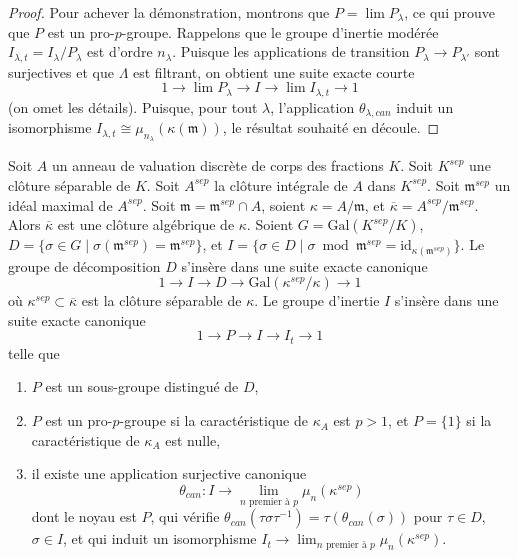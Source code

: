 \begin{proof}
\medskip\noindent
Pour achever la démonstration, montrons que $P = \lim P_\lambda$, ce qui prouve
que $P$ est un pro-$p$-groupe. Rappelons que le groupe d'inertie modérée
$I_{\lambda, t} = I_\lambda/P_\lambda$ est d'ordre $n_\lambda$.
Puisque les applications de transition $P_\lambda \to P_{\lambda'}$ sont surjectives
et que $\Lambda$ est filtrant, on obtient une suite exacte courte
$$
1 \to \lim P_\lambda \to I \to \lim I_{\lambda, t} \to 1
$$
(on omet les détails). Puisque, pour tout $\lambda$, l'application $\theta_{\lambda, can}$
induit un isomorphisme
$I_{\lambda, t} \cong \mu_{n_\lambda}(\kappa(\mathfrak m))$,
le résultat souhaité en découle.
\end{proof}

\begin{lemma}
\label{lemma-structure-decomposition-separable-closure}
Soit $A$ un anneau de valuation discrète de corps des fractions $K$.
Soit $K^{sep}$ une clôture séparable de $K$.
Soit $A^{sep}$ la clôture intégrale de $A$ dans $K^{sep}$.
Soit $\mathfrak m^{sep}$ un idéal maximal de $A^{sep}$.
Soit $\mathfrak m = \mathfrak m^{sep} \cap A$, soient
$\kappa = A/\mathfrak m$, et
$\overline{\kappa} = A^{sep}/\mathfrak m^{sep}$.
Alors $\overline{\kappa}$ est une clôture algébrique de $\kappa$.
Soient $G = \text{Gal}(K^{sep}/K)$,
$D = \{\sigma \in G \mid \sigma(\mathfrak m^{sep}) = \mathfrak m^{sep}\}$, et
$I = \{\sigma \in D \mid \sigma \bmod \mathfrak m^{sep} =
\text{id}_{\kappa(\mathfrak m^{sep})}\}$.
Le groupe de décomposition $D$ s'insère dans une suite exacte canonique
$$
1 \to I \to D \to \text{Gal}(\kappa^{sep}/\kappa) \to 1
$$
où $\kappa^{sep} \subset \overline{\kappa}$ est la clôture
séparable de $\kappa$.
Le groupe d'inertie $I$ s'insère dans une suite exacte canonique
$$
1 \to P \to I \to I_t \to 1
$$
telle que
\begin{enumerate}
\item $P$ est un sous-groupe distingué de $D$,
\item $P$ est un pro-$p$-groupe si la caractéristique de
$\kappa_A$ est $p > 1$, et $P = \{1\}$ si la caractéristique de $\kappa_A$
est nulle,
\item il existe une application surjective canonique
$$
\theta_{can} : I \to \lim_{n\text{ premier à }p} \mu_n(\kappa^{sep})
$$
dont le noyau est $P$, qui vérifie
$\theta_{can}(\tau \sigma \tau^{-1}) = \tau(\theta_{can}(\sigma))$
pour $\tau \in D$, $\sigma \in I$, et qui induit un isomorphisme
$I_t \to \lim_{n\text{ premier à }p} \mu_n(\kappa^{sep})$.
\end{enumerate}
\end{lemma}

